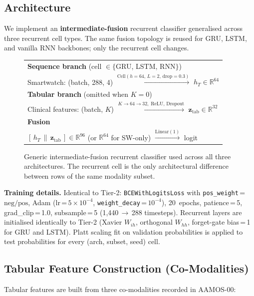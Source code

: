 \documentclass[11pt,a4paper]{article}
\begin{document}
\subsection{Architecture}

We implement an \textbf{intermediate-fusion} recurrent classifier
generalised across three recurrent cell types.  The same fusion topology
is reused for GRU, LSTM, and vanilla RNN backbones; only the recurrent
cell changes.

\begin{figure}[H]
\centering
\small
\begin{tabular}{l}
\textbf{Sequence branch} (cell $\in \{$GRU, LSTM, RNN$\}$) \\
Smartwatch: (batch, 288, 4) $\xrightarrow{\text{Cell}(h{=}64,\,L{=}2,\,\text{drop}{=}0.3)}$ $h_T \in \mathbb{R}^{64}$ \\[4pt]
\textbf{Tabular branch} (omitted when $K=0$) \\
Clinical features: (batch, $K$) $\xrightarrow{K \to 64 \to 32,\;\text{ReLU, Dropout}}$ $\mathbf{z}_\text{tab} \in \mathbb{R}^{32}$ \\[4pt]
\textbf{Fusion} \\
$[\,h_T\,\|\,\mathbf{z}_\text{tab}\,] \in \mathbb{R}^{96}$ (or $\mathbb{R}^{64}$ for SW-only) $\xrightarrow{\text{Linear}(1)}$ logit
\end{tabular}
\caption{Generic intermediate-fusion recurrent classifier used across all
three architectures.  The recurrent cell is the only architectural
difference between rows of the same modality subset.}
\label{fig:fusion_arch}
\end{figure}

\noindent\textbf{Training details.}
Identical to Tier-2: \texttt{BCEWithLogitsLoss} with
\texttt{pos\_weight}\,=\,$\text{neg}/\text{pos}$, Adam
(lr\,=\,$5\!\times\!10^{-4}$, \texttt{weight\_decay}\,=\,$10^{-4}$),
20~epochs, patience\,=\,5, grad\_clip\,=\,1.0, subsample\,=\,5
(1{,}440\,$\to$\,288 timesteps).  Recurrent layers are initialised
identically to Tier-2 (Xavier $W_{ih}$, orthogonal $W_{hh}$, forget-gate
bias\,=\,1 for GRU and LSTM).  Platt scaling fit on validation
probabilities is applied to test probabilities for every (arch, subset,
seed) cell.

\subsection{Tabular Feature Construction (Co-Modalities)}

Tabular features are built from three co-modalities recorded in AAMOS-00:
\end{document}
